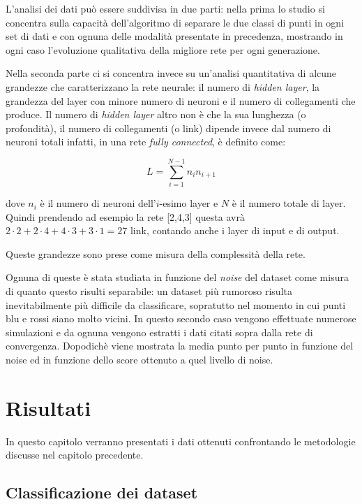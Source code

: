 \documentclass[12pt,a4paper]{report}
\begin{document}
L'analisi dei dati può essere suddivisa in due parti: nella prima lo studio si concentra sulla capacità dell'algoritmo di separare le due classi di punti in ogni set di dati e con ognuna delle modalità presentate in precedenza, mostrando in ogni caso l'evoluzione qualitativa della migliore rete per ogni generazione.

Nella seconda parte ci si concentra invece su un'analisi quantitativa di alcune grandezze che caratterizzano la rete neurale: il numero di \textit{hidden layer}, la grandezza del layer con minore numero di neuroni e il numero di collegamenti che produce.
Il numero di \textit{hidden layer} altro non è che la sua lunghezza (o profondità), il numero di collegamenti (o link) dipende invece dal numero di neuroni totali infatti, in una rete \textit{fully connected}, è definito come:

\begin{equation}
 L = \sum_{i = 1}^{N-1} n_{i}n_{i+1}
\end{equation}

dove $n_{i}$ è il numero di neuroni dell'$i$-esimo layer e $N$ è il numero totale di layer.
Quindi prendendo ad esempio la rete [2,4,3] questa avrà $2\cdot2 + 2\cdot4 + 4\cdot3 + 3\cdot1 = 27$ link, contando anche i layer di input e di output.

Queste grandezze sono prese come misura della complessità della rete.

Ognuna di queste è stata studiata in funzione del \textit{noise} del dataset come misura di quanto questo risulti separabile: un dataset più rumoroso risulta inevitabilmente più difficile da classificare, sopratutto nel momento in cui punti blu e rossi siano molto vicini.
In questo secondo caso vengono effettuate numerose simulazioni e da ognuna vengono estratti i dati citati sopra dalla rete di convergenza.
Dopodichè viene mostrata la media punto per punto in funzione del noise ed in funzione dello score ottenuto a quel livello di noise.

\chapter{Risultati}

In questo capitolo verranno presentati i dati ottenuti confrontando le  metodologie discusse nel capitolo precedente.

\section{Classificazione dei dataset}
\end{document}
